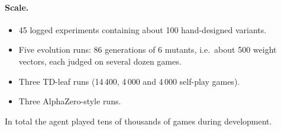 \paragraph{Scale.}
\begin{itemize}
  \item 45 logged experiments containing about 100 hand-designed variants.
  \item Five evolution runs: 86 generations of 6 mutants, i.e.\ about 500 weight vectors, each
        judged on several dozen games.
  \item Three TD-leaf runs (14\,400, 4\,000 and 4\,000 self-play games).
  \item Three AlphaZero-style runs.
\end{itemize}
In total the agent played tens of thousands of games during development.
